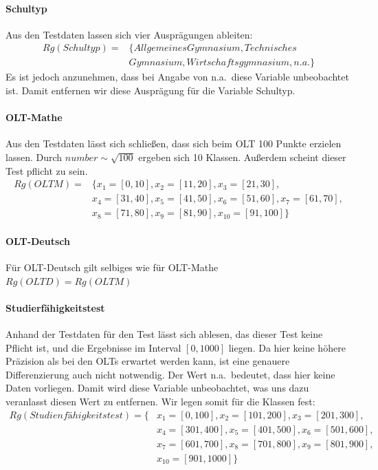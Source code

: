 \paragraph{Schultyp} Aus den Testdaten lassen sich vier Ausprägungen ableiten: 
\begin{equation*}
\begin{split}
Rg(Schultyp) =  & \{Allgemeines Gymnasium, Technisches \\
				& Gymnasium, Wirtschaftsgymnasium, n.a.\}
\end{split}
\end{equation*}
Es ist jedoch anzunehmen, dass bei Angabe von \glqq n.a.\grqq \ diese Variable unbeobachtet ist. Damit entfernen wir diese Ausprägung für die Variable Schultyp. 

\paragraph{OLT-Mathe} Aus den Testdaten lässt sich schließen, dass sich beim OLT 100 Punkte erzielen lassen. Durch $number \sim \sqrt{100}$ ergeben sich 10 Klassen. Außerdem scheint dieser Test pflicht zu sein. 
\begin{equation*}
\begin{split}
Rg(OLTM)= 	& \{ x_1=[0,10], x_2=[11,20], x_3=[21,30], \\
			& x_4=[31,40], x_5=[41,50], x_6=[51,60], x_7=[61,70], \\
			& x_8=[71,80], x_9=[81,90], x_{10}=[91,100]\}
\end{split}
\end{equation*}
\paragraph{OLT-Deutsch} Für OLT-Deutsch gilt selbiges wie für OLT-Mathe \\ $Rg(OLTD)=Rg(OLTM)$
\paragraph{Studierfähigkeitstest} Anhand der Testdaten für den Test lässt sich ablesen, das dieser Test keine Pflicht ist, und die Ergebnisse im Interval $[0,1000]$ liegen. Da hier keine höhere Präzision als bei den OLTs erwartet werden kann, ist eine genauere Differenzierung auch nicht notwendig. Der Wert \glqq n.a.\grqq \ bedeutet, dass hier keine Daten vorliegen. Damit wird diese Variable unbeobachtet, was uns dazu veranlasst diesen Wert zu entfernen.  Wir legen somit für die Klassen fest: 
\begin{equation*}
\begin{split}
Rg(Studienfähigkeitstest)=\{ & x_1=[0,100], x_2=[101,200], x_3=[201,300], \\
	 						 & x_4=[301,400], x_5=[401,500], x_6=[501,600], \\
							 & x_7=[601,700], x_8=[701,800], x_9=[801,900], \\ 
							 & x_{10}=[901,1000] \}
\end{split}
\end{equation*}
